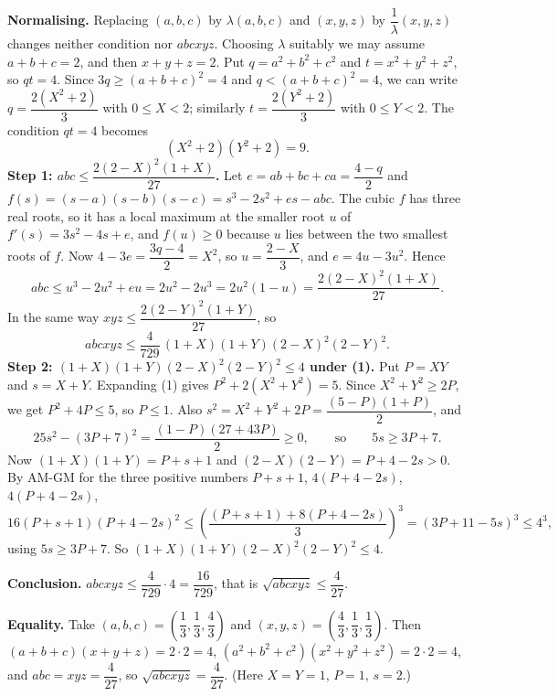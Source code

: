 \textbf{Normalising.} Replacing $(a,b,c)$ by $\lambda(a,b,c)$ and $(x,y,z)$ by $\dfrac{1}{\lambda}(x,y,z)$ changes neither condition nor $abcxyz$. Choosing $\lambda$ suitably we may assume $a+b+c=2$, and then $x+y+z=2$. Put $q=a^2+b^2+c^2$ and $t=x^2+y^2+z^2$, so $qt=4$. Since $3q\ge(a+b+c)^2=4$ and $q<(a+b+c)^2=4$, we can write $q=\dfrac{2\left(X^2+2\right)}{3}$ with $0\le X<2$; similarly $t=\dfrac{2\left(Y^2+2\right)}{3}$ with $0\le Y<2$. The condition $qt=4$ becomes
\[
\left(X^2+2\right)\left(Y^2+2\right)=9. \tag{1}
\]
\textbf{Step 1: $abc\le\dfrac{2(2-X)^2(1+X)}{27}$.} Let $e=ab+bc+ca=\dfrac{4-q}{2}$ and $f(s)=(s-a)(s-b)(s-c)=s^3-2s^2+es-abc$. The cubic $f$ has three real roots, so it has a local maximum at the smaller root $u$ of $f'(s)=3s^2-4s+e$, and $f(u)\ge0$ because $u$ lies between the two smallest roots of $f$. Now $4-3e=\dfrac{3q-4}{2}=X^2$, so $u=\dfrac{2-X}{3}$, and $e=4u-3u^2$. Hence
\[
abc\le u^3-2u^2+eu=2u^2-2u^3=2u^2(1-u)=\dfrac{2(2-X)^2(1+X)}{27}.
\]
In the same way $xyz\le\dfrac{2(2-Y)^2(1+Y)}{27}$, so
\[
abcxyz\le\dfrac{4}{729}\,(1+X)(1+Y)(2-X)^2(2-Y)^2 .
\]
\textbf{Step 2: $(1+X)(1+Y)(2-X)^2(2-Y)^2\le4$ under (1).} Put $P=XY$ and $s=X+Y$. Expanding (1) gives $P^2+2\left(X^2+Y^2\right)=5$. Since $X^2+Y^2\ge2P$, we get $P^2+4P\le5$, so $P\le1$. Also $s^2=X^2+Y^2+2P=\dfrac{(5-P)(1+P)}{2}$, and
\[
25s^2-(3P+7)^2=\dfrac{(1-P)(27+43P)}{2}\ge0,\qquad\text{so}\qquad5s\ge3P+7 .
\]
Now $(1+X)(1+Y)=P+s+1$ and $(2-X)(2-Y)=P+4-2s>0$. By AM-GM for the three positive numbers $P+s+1$, $4(P+4-2s)$, $4(P+4-2s)$,
\[
16(P+s+1)(P+4-2s)^2\le\left(\dfrac{(P+s+1)+8(P+4-2s)}{3}\right)^3=(3P+11-5s)^3\le4^3,
\]
using $5s\ge3P+7$. So $(1+X)(1+Y)(2-X)^2(2-Y)^2\le4$.

\textbf{Conclusion.} $abcxyz\le\dfrac{4}{729}\cdot4=\dfrac{16}{729}$, that is $\boxed{\sqrt{abcxyz}\le\dfrac{4}{27}}$.

\textbf{Equality.} Take $(a,b,c)=\left(\dfrac{1}{3},\dfrac{1}{3},\dfrac{4}{3}\right)$ and $(x,y,z)=\left(\dfrac{4}{3},\dfrac{1}{3},\dfrac{1}{3}\right)$. Then $(a+b+c)(x+y+z)=2\cdot2=4$, $\left(a^2+b^2+c^2\right)\left(x^2+y^2+z^2\right)=2\cdot2=4$, and $abc=xyz=\dfrac{4}{27}$, so $\sqrt{abcxyz}=\dfrac{4}{27}$. (Here $X=Y=1$, $P=1$, $s=2$.)
